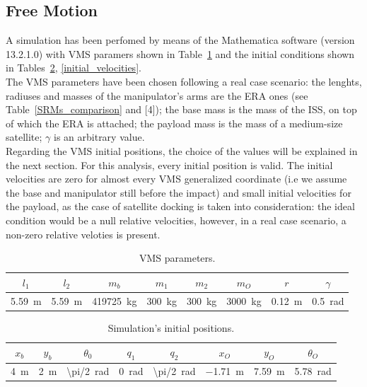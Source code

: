 \documentclass[a4paper,12pt,oneside]{report}
\begin{document}
\subsection{Free Motion}
A simulation has been perfomed by means of the Mathematica software (version 13.2.1.0) with VMS paramers shown in Table~\ref{VMS_parameters} and the initial conditions shown in Tables~\ref{initial_positions}, \ref{initial_velocities}.\\
The VMS parameters have been chosen following a real case scenario: the lenghts, radiuses and masses of the manipulator's arms are the ERA ones (see Table~\ref{SRMs_comparison} and [4]); the base mass is the mass of the ISS, on top of which the ERA is attached; the payload mass is the mass of a medium-size satellite; $\gamma$ is an arbitrary value.\\
Regarding the VMS initial positions, the choice of the values will be explained in the next section. For this analysis, every initial position is valid. The initial velocities are zero for almost every VMS generalized coordinate (i.e we assume the base and manipulator still before the impact) and small initial velocities for the payload, as the case of satellite docking is taken into consideration: the ideal condition would be a null relative velocities, however, in a real case scenario, a non-zero relative veloties is present.\\
\begin{table}
  \caption{VMS parameters.}
  \label{VMS_parameters}
  \begin{center}
  \begin{tabular}{cccccccc}
    \toprule
    $l_1$&$l_2$&$m_b$&$m_1$&$m_2$&$m_O$&$r$&$\gamma$\\
  \midrule
    \SI{5.59}{\metre}&\SI{5.59}{\metre}&\SI{419725}{\kilogram}&\SI{300}{\kilogram}&\SI{300}{\kilogram}&\SI{3000}{\kilogram}&\SI{0.12}{\metre}&\SI{0.5}{\radian}\\
  \bottomrule
  \end{tabular}
  \end{center}
\end{table}
\begin{table}
  \caption{Simulation's initial positions.}
  \label{initial_positions}
  \begin{center}
  \begin{tabular}{cccccccc}
    \toprule
    $x_b$&$y_b$&$\theta_0$&$q_1$&$q_2$&$x_O$&$y_O$&$\theta_O$\\
  \midrule
    \SI{4}{\metre}&\SI{2}{\metre}&\SI[parse-numbers = false]{\pi/2}{\radian}&\SI{0}{\radian}&\SI[parse-numbers = false]{\pi/2}{\radian}&\SI{-1.71}{\metre}&\SI{7.59}{\metre}&\SI{5.78}{\radian}\\
  \bottomrule
  \end{tabular}
  \end{center}
\end{table}
\end{document}
